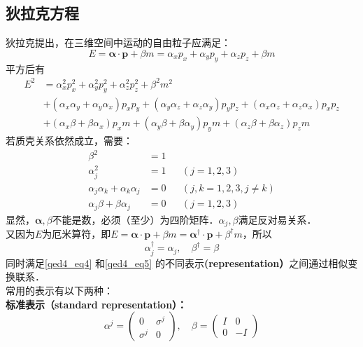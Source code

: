\subsection{狄拉克方程}
狄拉克提出，在三维空间中运动的自由粒子应满足：
\begin{equation}\label{qed4_eq2}
E=\boldsymbol{\alpha} \cdot \boldsymbol{p}+\beta m=\alpha_{x} p_{x}+\alpha_{y} p_{y}+\alpha_{z} p_{z}+\beta m
\end{equation}
平方后有
\begin{equation}\label{qed4_eq3}
\begin{aligned}
E^{2} &=\alpha_{x}^{2} p_{x}^{2}+\alpha_{y}^{2} p_{y}^{2}+\alpha_{z}^{2} p_{z}^{2}+\beta^{2} m^{2} \\
&+\left(\alpha_{x} \alpha_{y}+\alpha_{y} \alpha_{x}\right) p_{x} p_{y}+\left(\alpha_{y} \alpha_{z}+\alpha_{z} \alpha_{y}\right) p_{y} p_{z}+\left(\alpha_{x} \alpha_{z}+\alpha_{z} \alpha_{x}\right) p_{x} p_{z} \\
&+\left(\alpha_{x} \beta+\beta \alpha_{x}\right) p_{x} m+\left(\alpha_{y} \beta+\beta \alpha_{y}\right) p_{y} m+\left(\alpha_{z} \beta+\beta \alpha_{z}\right) p_{z} m
\end{aligned}
\end{equation}
若质壳关系依然成立，需要：
\begin{equation}\label{qed4_eq4}
\begin{aligned}
\beta^{2} &=1 & & \\
\alpha_j^{2} &=1 & &(j=1,2,3) \\
\alpha_j \alpha_k+\alpha_k \alpha_j &=0 & &(j, k=1,2,3, j \neq k) \\
\alpha_j \beta+\beta \alpha_j &=0 & &(j=1,2,3)
\end{aligned}
\end{equation}
显然，$\boldsymbol{\alpha}, \beta$不能是数，必须（至少）为四阶矩阵．$\alpha_j, \beta$满足反对易关系．
\\又因为$E$为厄米算符，即$E=\boldsymbol{\alpha} \cdot \boldsymbol{p}+\beta m=\boldsymbol{\alpha}^\dagger \cdot \boldsymbol{p}+\beta^\dagger m$，所以
\begin{equation}\label{qed4_eq5}
\alpha_j^{\dagger}=\alpha_j, \quad \beta^{\dagger}=\beta
\end{equation}
同时满足\autoref{qed4_eq4} 和\autoref{qed4_eq5} 的不同表示\textbf{(representation）}之间通过相似变换联系．
\\常用的表示有以下两种：
\\\textbf{标准表示（standard representation）：}
\begin{equation}\label{qed4_eq6}
\alpha^{j}=\left(\begin{array}{cc}
0 & \sigma^{j} \\
\sigma^{j} & 0
\end{array}\right), \quad \beta=\left(\begin{array}{rr}
I & 0 \\
0 & -I
\end{array}\right)
\end{equation}
